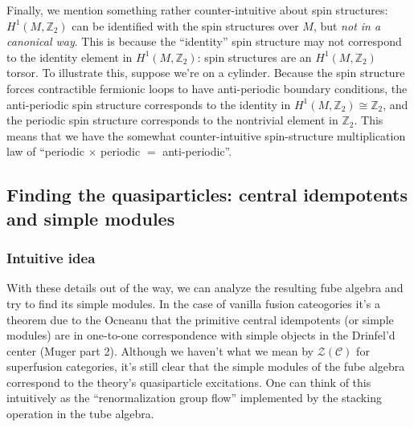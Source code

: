 \documentclass[12pt,a4paper]{article}
\newcommand{\mcz}{\mathcal{Z}}
\newcommand{\zt}{\mathbb{Z}_2}
\newcommand{\mcc}{\mathcal{C}}
\begin{document}
Finally, we mention something rather counter-intuitive about spin structures: $H^1(M,\zt)$ can be identified with the spin structures over $M$, but {\it not in a canonical way}. This is because the ``identity'' spin structure may not correspond to the identity element in $H^1(M,\zt)$: spin structures are an $H^1(M,\zt)$ torsor. To illustrate this, suppose we're on a cylinder. Because the spin structure forces contractible fermionic loops to have anti-periodic boundary conditions, the anti-periodic spin structure corresponds to the identity in $H^1(M,\zt) \cong \zt$, and the periodic spin structure corresponds to the nontrivial element in $\zt$. This means that we have the somewhat counter-intuitive spin-structure multiplication law of ``periodic $\times$ periodic $=$ anti-periodic''.


\subsection{Finding the quasiparticles: central idempotents and simple modules} 

\subsubsection{Intuitive idea}

With these details out of the way, we can analyze the resulting fube algebra and try to find its simple modules. 
In the case of vanilla fusion cateogories it's a theorem due to the Ocneanu that the primitive central idempotents (or simple modules) are in one-to-one correspondence with simple objects in the Drinfel'd center (Muger part 2). Although we haven't what we mean by $\mcz(\mcc)$ for superfusion categories, it's still clear that the simple modules of the fube algebra correspond to the theory's quasiparticle excitations.
One can think of this intuitively as the
``renormalization group flow'' implemented by the stacking operation in the tube algebra. 
\end{document}
